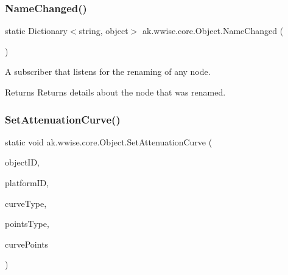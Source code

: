 \subsubsection{\texorpdfstring{Name\+Changed()}{NameChanged()}}
{\footnotesize\ttfamily static Dictionary$<$string, object$>$ ak.\+wwise.\+core.\+Object.\+Name\+Changed (\begin{DoxyParamCaption}{ }\end{DoxyParamCaption})\hspace{0.3cm}{\ttfamily [static]}}



A subscriber that listens for the renaming of any node. 

\begin{DoxyReturn}{Returns}
Returns details about the node that was renamed.
\end{DoxyReturn}
\mbox{\label{classak_1_1wwise_1_1core_1_1_object_a03d302c6095e49eb94c36c07380b876f}} 
\subsubsection{\texorpdfstring{Set\+Attenuation\+Curve()}{SetAttenuationCurve()}}
{\footnotesize\ttfamily static void ak.\+wwise.\+core.\+Object.\+Set\+Attenuation\+Curve (\begin{DoxyParamCaption}\item[{string}]{object\+ID,  }\item[{string}]{platform\+ID,  }\item[{\mbox{\hyperlink{class_waapi_c_s_1_1_custom_values_1_1_wwise_values_a5fa07a83f99814d445c7075a3ebf4850}{Wwise\+Values.\+Curve\+Type}}}]{curve\+Type,  }\item[{\mbox{\hyperlink{class_waapi_c_s_1_1_custom_values_1_1_wwise_values_ae8b620ede7bbe13a8185450675c9ca75}{Wwise\+Values.\+Curve\+Points\+Type}}}]{points\+Type,  }\item[{\mbox{\hyperlink{class_waapi_c_s_1_1_custom_values_1_1_wwise_values_1_1_curve_point}{Wwise\+Values.\+Curve\+Point}} \mbox{[}$\,$\mbox{]}}]{curve\+Points }\end{DoxyParamCaption})\hspace{0.3cm}{\ttfamily [static]}}



